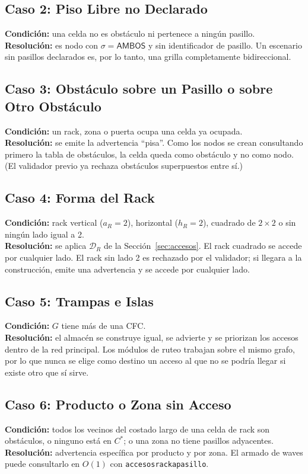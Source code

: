 \documentclass[11pt,a4paper]{article}
\theoremstyle{definition}
\newcommand{\sA}{\textsf{AMBOS}}
\begin{document}
\subsection{Caso 2: Piso Libre no Declarado}
\textbf{Condición:} una celda no es obstáculo ni pertenece a ningún pasillo.\\
\textbf{Resolución:} es nodo con $\sigma=\sA$ y sin identificador de pasillo. Un escenario sin pasillos declarados es, por lo tanto, una grilla completamente bidireccional.

\subsection{Caso 3: Obstáculo sobre un Pasillo o sobre Otro Obstáculo}
\textbf{Condición:} un rack, zona o puerta ocupa una celda ya ocupada.\\
\textbf{Resolución:} se emite la advertencia ``pisa''. Como los nodos se crean consultando primero la tabla de obstáculos, la celda queda como obstáculo y no como nodo. (El validador previo ya rechaza obstáculos superpuestos entre sí.)

\subsection{Caso 4: Forma del Rack}
\textbf{Condición:} rack vertical ($a_R=2$), horizontal ($h_R=2$), cuadrado de $2\times2$ o sin ningún lado igual a 2.\\
\textbf{Resolución:} se aplica $\mathcal{D}_R$ de la Sección~\ref{sec:accesos}. El rack cuadrado se accede por cualquier lado. El rack sin lado 2 es rechazado por el validador; si llegara a la construcción, emite una advertencia y se accede por cualquier lado.

\subsection{Caso 5: Trampas e Islas}
\textbf{Condición:} $G$ tiene más de una CFC.\\
\textbf{Resolución:} el almacén se construye igual, se advierte y se priorizan los accesos dentro de la red principal. Los módulos de ruteo trabajan sobre el mismo grafo, por lo que nunca se elige como destino un acceso al que no se podría llegar si existe otro que sí sirve.

\subsection{Caso 6: Producto o Zona sin Acceso}
\textbf{Condición:} todos los vecinos del costado largo de una celda de rack son obstáculos, o ninguno está en $C^\ast$; o una zona no tiene pasillos adyacentes.\\
\textbf{Resolución:} advertencia específica por producto y por zona. El armado de waves puede consultarlo en $O(1)$ con \texttt{accesos{}rack{}a{}pasillo}.
\end{document}
